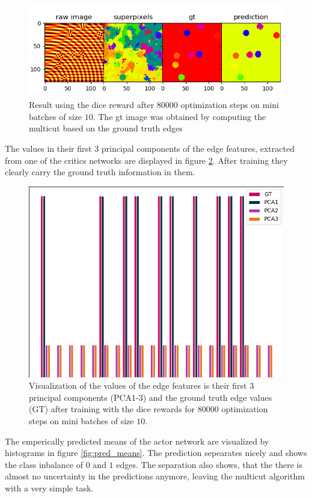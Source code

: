 \begin{figure}[ht!]
	\centering
	\includegraphics[width=.7\textwidth]{figures/plots/results_dice_reward.png}
	\caption{Result using the dice reward after $80000$ optimization steps on mini batches of size $10$. The gt image was obtained by computing the multicut based on the ground truth edges}
	\label{fig:resa_dice}
\end{figure}

The values in their first $3$ principal components of the edge features, extracted from one of the critics networks are displayed in figure \ref{fig:res_edge_embed}. After training they clearly carry the ground truth information in them.\\

\begin{figure}[ht!]
	\centering
	\includegraphics[width=.5\textwidth]{figures/plots/edge_embeddings.png}
	\caption{Visualization of the values of the edge features is their first $3$ principal components (PCA1-3) and the ground truth edge values (GT) after training with the dice rewards for $80000$ optimization steps on mini batches of size $10$.}
	\label{fig:res_edge_embed}
\end{figure}

The emperically predicted means of the actor network are visualized by histograms in figure \ref{fig:pred_means}. The prediction sepearates nicely and shows the class inbalance of $0$ and $1$ edges. The separation also shows, that the there is almost no uncertainty in the predictions anymore, leaving the multicut algorithm with a very simple task.

